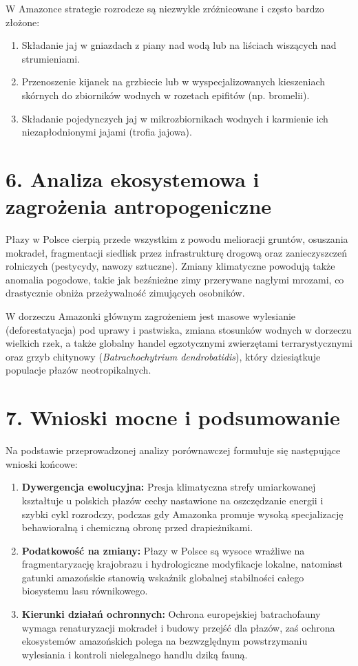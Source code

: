 W Amazonce strategie rozrodcze są niezwykle zróżnicowane i często bardzo złożone:
\begin{enumerate}
\item Składanie jaj w gniazdach z piany nad wodą lub na liściach wiszących nad strumieniami.
\item Przenoszenie kijanek na grzbiecie lub w wyspecjalizowanych kieszeniach skórnych do zbiorników wodnych w rozetach epifitów (np. bromelii).
\item Składanie pojedynczych jaj w mikrozbiornikach wodnych i karmienie ich niezapłodnionymi jajami (trofia jajowa).
\end{enumerate}

\section*{6. Analiza ekosystemowa i zagrożenia antropogeniczne}
Płazy w Polsce cierpią przede wszystkim z powodu melioracji gruntów, osuszania mokradeł, fragmentacji siedlisk przez infrastrukturę drogową oraz zanieczyszczeń rolniczych (pestycydy, nawozy sztuczne). Zmiany klimatyczne powodują także anomalia pogodowe, takie jak bezśnieżne zimy przerywane nagłymi mrozami, co drastycznie obniża przeżywalność zimujących osobników.

W dorzeczu Amazonki głównym zagrożeniem jest masowe wylesianie (deforestatyacja) pod uprawy i pastwiska, zmiana stosunków wodnych w dorzeczu wielkich rzek, a także globalny handel egzotycznymi zwierzętami terrarystycznymi oraz grzyb chitynowy (\textit{Batrachochytrium dendrobatidis}), który dziesiątkuje populacje płazów neotropikalnych.

\section*{7. Wnioski mocne i podsumowanie}
Na podstawie przeprowadzonej analizy porównawczej formułuje się następujące wnioski końcowe:
\begin{enumerate}
\item \textbf{Dywergencja ewolucyjna:} Presja klimatyczna strefy umiarkowanej kształtuje u polskich płazów cechy nastawione na oszczędzanie energii i szybki cykl rozrodczy, podczas gdy Amazonka promuje wysoką specjalizację behawioralną i chemiczną obronę przed drapieżnikami.
    \item \textbf{Podatkowość na zmiany:} Płazy w Polsce są wysoce wrażliwe na fragmentaryzację krajobrazu i hydrologiczne modyfikacje lokalne, natomiast gatunki amazońskie stanowią wskaźnik globalnej stabilności całego biosystemu lasu równikowego.
\item \textbf{Kierunki działań ochronnych:} Ochrona europejskiej batrachofauny wymaga renaturyzacji mokradeł i budowy przejść dla płazów, zaś ochrona ekosystemów amazońskich polega na bezwzględnym powstrzymaniu wylesiania i kontroli nielegalnego handlu dziką fauną.
\end{enumerate}
